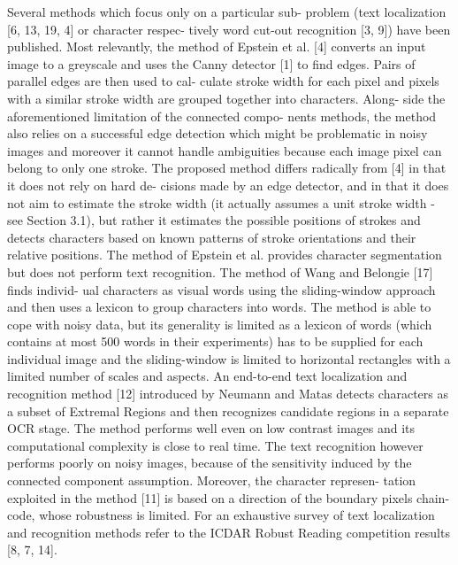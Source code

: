 Several methods which focus only on a particular sub-
problem (text localization [6, 13, 19, 4] or character respec-
tively word cut-out recognition [3, 9]) have been published.
Most relevantly, the method of Epstein et al. [4] converts an
input image to a greyscale and uses the Canny detector [1]
to find edges. Pairs of parallel edges are then used to cal-
culate stroke width for each pixel and pixels with a similar
stroke width are grouped together into characters. Along-
side the aforementioned limitation of the connected compo-
nents methods, the method also relies on a successful edge
detection which might be problematic in noisy images and
moreover it cannot handle ambiguities because each image
pixel can belong to only one stroke. The proposed method
differs radically from [4] in that it does not rely on hard de-
cisions made by an edge detector, and in that it does not
aim to estimate the stroke width (it actually assumes a unit
stroke width - see Section 3.1), but rather it estimates the
possible positions of strokes and detects characters based
on known patterns of stroke orientations and their relative
positions. The method of Epstein et al. provides character
segmentation but does not perform text recognition.
The method of Wang and Belongie [17] finds individ-
ual characters as visual words using the sliding-window
approach and then uses a lexicon to group characters into
words. The method is able to cope with noisy data, but its
generality is limited as a lexicon of words (which contains
at most 500 words in their experiments) has to be supplied
for each individual image and the sliding-window is limited
to horizontal rectangles with a limited number of scales and
aspects.
An end-to-end text localization and recognition
method [12] introduced by Neumann and Matas detects
characters as a subset of Extremal Regions and then
recognizes candidate regions in a separate OCR stage.
The method performs well even on low contrast images
and its computational complexity is close to real time.
The text recognition however performs poorly on noisy
images, because of the sensitivity induced by the connected
component assumption. Moreover, the character represen-
tation exploited in the method [11] is based on a direction
of the boundary pixels chain-code, whose robustness is
limited. For an exhaustive survey of text localization and
recognition methods refer to the ICDAR Robust Reading
competition results [8, 7, 14].

